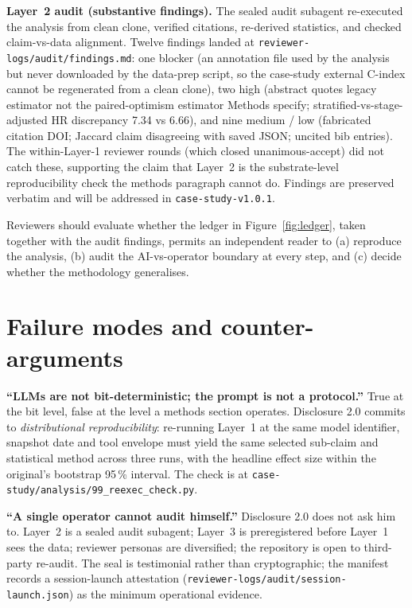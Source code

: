 \documentclass[11pt,a4paper]{article}
\begin{document}
\textbf{Layer~2 audit (substantive findings).} The sealed audit subagent re-executed the analysis from clean clone, verified citations, re-derived statistics, and checked claim-vs-data alignment. Twelve findings landed at \texttt{reviewer-logs/audit/findings.md}: one blocker (an annotation file used by the analysis but never downloaded by the data-prep script, so the case-study external C-index cannot be regenerated from a clean clone), two high (abstract quotes legacy estimator not the paired-optimism estimator Methods specify; stratified-vs-stage-adjusted HR discrepancy 7.34 vs 6.66), and nine medium / low (fabricated citation DOI; Jaccard claim disagreeing with saved JSON; uncited bib entries). The within-Layer-1 reviewer rounds (which closed unanimous-accept) did not catch these, supporting the claim that Layer~2 is the substrate-level reproducibility check the methods paragraph cannot do. Findings are preserved verbatim and will be addressed in \texttt{case-study-v1.0.1}.

Reviewers should evaluate whether the ledger in Figure~\ref{fig:ledger}, taken together with the audit findings, permits an independent reader to (a) reproduce the analysis, (b) audit the AI-vs-operator boundary at every step, and (c) decide whether the methodology generalises.

\section{Failure modes and counter-arguments}\label{sec:counter}

\textbf{``LLMs are not bit-deterministic; the prompt is not a protocol.''} True at the bit level, false at the level a methods section operates. Disclosure 2.0 commits to \emph{distributional reproducibility}: re-running Layer~1 at the same model identifier, snapshot date and tool envelope must yield the same selected sub-claim and statistical method across three runs, with the headline effect size within the original's bootstrap 95\,\% interval. The check is at \texttt{case-study/analysis/99\_reexec\_check.py}.

\textbf{``A single operator cannot audit himself.''} Disclosure 2.0 does not ask him to. Layer~2 is a sealed audit subagent; Layer~3 is preregistered before Layer~1 sees the data; reviewer personas are diversified; the repository is open to third-party re-audit. The seal is testimonial rather than cryptographic; the manifest records a session-launch attestation (\texttt{reviewer-logs/audit/session-launch.json}) as the minimum operational evidence.
\end{document}
